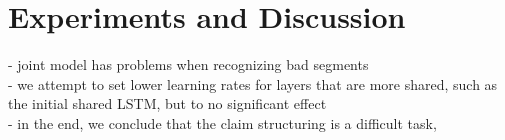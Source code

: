 \section{Experiments and Discussion}

- joint model has problems when recognizing bad segments \\
- we attempt to set lower learning rates for layers that are more shared, 
such as the initial shared LSTM, but to no significant effect \\

- in the end, we conclude that the claim structuring is a difficult task, 
